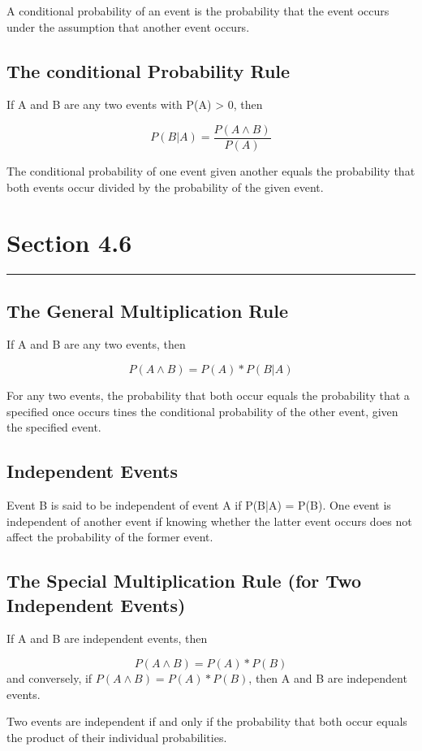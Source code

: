 \documentclass[12pt]{article}
\begin{document}
            \subsubsection*{}
                A conditional probability of an event is the probability that the event occurs under
                the assumption that another event occurs.
        \subsection*{The conditional Probability Rule}
            If A and B are any two events with P(A) > 0, then
            \begin{center}
                \[
                P(B|A) = \frac{P(A \wedge B)}{P(A)}
                \]
            \end{center}
            The conditional probability of one event given another equals the probability that both 
            events occur divided by the probability of the given event.
            
    \section*{Section 4.6}
    \noindent\rule{\textwidth}{0.4pt}
        \subsection*{The General Multiplication Rule}
            If A and B are any two events, then 
            \begin{center}
                \[
                    P(A \wedge B) = P(A) * P(B|A)
                \]
            \end{center}
            For any two events, the probability that both occur equals the probability that a specified
            once occurs tines the conditional probability of the other event, given the specified event.         
        \subsection*{Independent Events}
            Event B is said to be independent of event A if P(B|A) = P(B). One event is independent of 
            another event if knowing whether the latter event occurs
            does not affect the probability of the former event.
        \subsection*{The Special Multiplication Rule (for Two Independent Events)}
            If A and B are independent events, then
            \begin{center}
                \[
                    P(A \wedge B) = P(A) * P(B)    
                \]
                and conversely, if $P(A \wedge B) = P(A) * P(B)$, then A and B are independent events. 
            \end{center}
            Two events are independent if and only if the probability that both occur equals the product
            of their individual probabilities.
\end{document}

